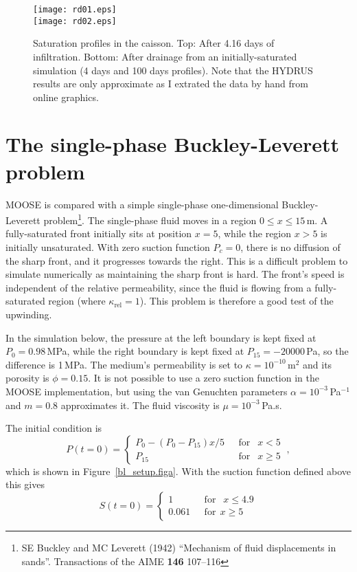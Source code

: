\documentclass[]{scrreprt}
\begin{document}
\begin{figure}[htb]
\begin{center}
\texttt{[image: rd01.eps]} \\
$\mbox{}$\\
\texttt{[image: rd02.eps]}
\caption{Saturation profiles in the caisson.  Top: After 4.16 days of
  infiltration.  Bottom: After drainage from an initially-saturated
  simulation (4 days and 100 days profiles).  Note that the HYDRUS
  results are only approximate as I extrated the data by hand from
  online graphics.}
\label{rd.result.fig}
\end{center}
\end{figure}


\chapter{The single-phase Buckley-Leverett problem}
\label{bl}

MOOSE is compared with a simple single-phase one-dimensional
Buckley-Leverett problem\footnote{SE Buckley and MC Leverett (1942)
  ``Mechanism of fluid displacements in sands''.  Transactions of the
  AIME {\bf 146} 107--116}.  The single-phase fluid moves in a region
$0\leq x\leq 15$\,m.  A fully-saturated front initially sits at
position $x=5$, while the region $x>5$ is initially unsaturated.  With
zero suction function $P_{c} = 0$, there is no diffusion of the sharp
front, and it progresses towards the right.  This is a difficult
problem to simulate numerically as maintaining the sharp front is
hard.  The front's speed is independent of the relative permeability,
since the fluid is flowing from a fully-saturated region (where
$\kappa_{\mathrm{rel}}=1$).  This problem is therefore a good test of
the upwinding.


In the simulation below, the pressure at the left boundary is kept
fixed at $P_{0}=0.98$\,MPa, while the right boundary is kept fixed at
$P_{15}=-20000$\,Pa, so the difference is 1\,MPa.  The medium's
permeability is set to $\kappa = 10^{-10}\,\mathrm{m}^{2}$ and its
porosity is $\phi = 0.15$.  It is not possible to use a zero suction
function in the MOOSE implementation, but using the van Genuchten
parameters $\alpha = 10^{-3}$\,Pa$^{-1}$ and $m=0.8$ approximates it.
The fluid viscosity is $\mu = 10^{-3}$\,Pa.s.

The initial condition is
\begin{equation}
P(t=0) = \left\{
\begin{array}{ll}
P_{0} - (P_{0}-P_{15})x/5 & \ \ \ \mbox{for }\ \ x<5 \\
P_{15} & \ \ \ \mbox{for }\ \ x\geq 5
\end{array}
\right. \ ,
\end{equation}
which is shown in
Figure~\ref{bl_setup.figa}.  With the suction function defined above
this gives
\begin{equation}
S(t=0) = \left\{
\begin{array}{ll}
1 & \ \ \ \mbox{for }\ \ x\leq 4.9 \\
0.061 & \ \ \ \mbox{for} \ \ x \geq 5
\end{array}
\right.
\end{equation}
\end{document}
